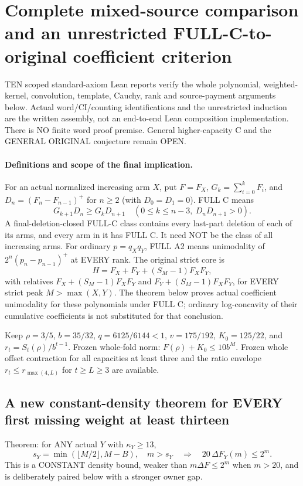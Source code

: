 \section{Complete mixed-source comparison and an unrestricted FULL-C-to-original coefficient criterion}
TEN scoped standard-axiom Lean reports verify the whole polynomial,
weighted-kernel, convolution, template, Cauchy, rank and source-payment
arguments below. Actual word/CI/counting identifications and the
unrestricted induction are the written assembly, not an end-to-end
Lean composition implementation. There is NO finite word proof premise.
General higher-capacity C and the GENERAL ORIGINAL conjecture remain OPEN.

\paragraph{Definitions and scope of the final implication.}
For an actual normalized increasing arm $X$, put $F=F_X$,
$G_k=\sum_{i=0}^kF_i$, and $D_n=(F_n-F_{n-1})^+$ for $n\ge2$
(with $D_0=D_1=0$). FULL C means
\[
 G_{k+1}D_n\ge G_kD_{n+1}\quad
 (0\le k\le n-3,\ D_nD_{n+1}>0).
\]
A final-deletion-closed FULL-C class contains every last-part deletion
of each of its arms, and every arm in it has FULL C. It need NOT be the
class of all increasing arms. For ordinary $p=q_Xq_Y$, FULL A2 means
unimodality of $2^n(p_n-p_{n-1})^+$ at EVERY rank. The original strict
core is
\[
 H=F_X+F_Y+(S_M-1)F_XF_Y,
\]
with relatives $F_X+(S_M-1)F_XF_Y$ and $F_Y+(S_M-1)F_XF_Y$, for EVERY
strict peak $M>\max(X,Y)$. The theorem below proves actual coefficient
unimodality for these polynomials under FULL C; ordinary log-concavity
of their cumulative coefficients is not substituted for that conclusion.

Keep $\rho=3/5$, $b=35/32$, $q=6125/6144<1$, $v=175/192$,
$K_0=125/22$, and $r_t=S_t(\rho)/b^{t-1}$. Frozen whole-fold norm:
$F(\rho)+K_0\le10b^M$. Frozen whole offset contraction for all
capacities at least three and the ratio envelope $r_t\le r_{\max(4,L)}$
for $t\ge L\ge3$ are available.

\subsection{A new constant-density theorem for EVERY first missing weight at least thirteen}
Theorem: for ANY actual $Y$ with $\kappa_Y\ge13$,
\[
 s_Y=\min(\lfloor M/2\rfloor,M-B),\quad m>s_Y
       \quad\Longrightarrow\quad20\,\Delta F_Y(m)\le2^m.       \tag{1}
\]
This is a CONSTANT density bound, weaker than $m\Delta F\le2^m$
when $m>20$, and is deliberately paired below with a stronger owner gap.

